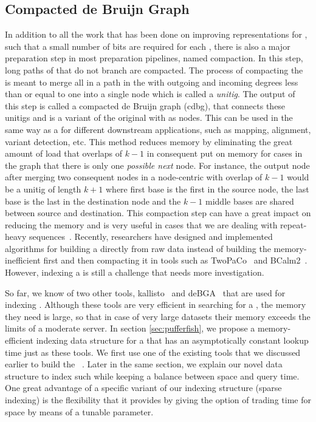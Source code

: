 \subsection{Compacted de Bruijn Graph}
\label{subsubsec:cdbg}
In addition to all the work that has been done on improving representations for \dbgs, such that a small number of bits are required for each \kmer, there is also a major preparation step in most \dbg preparation pipelines, named compaction. In this step, long paths of \kmers that do not branch are compacted. The process of compacting the \dbg is meant to merge all \kmers in a path in the \dbg with outgoing and incoming degrees less than or equal to one into a single node which is called a \emph{unitig}. The output of this step is called a compacted de Bruijn graph (cdbg), that connects these unitigs and is a variant of the original \dbg with \kmers as nodes. This can be used in the same way as a \dbg for different downstream applications, such as mapping, alignment, variant detection, etc. This method reduces memory by eliminating the great amount of load that overlaps of $k-1$ in consequent \kmers put on memory for cases in the graph that there is only one \textit{possible next} node. For instance, the output node after merging two consequent nodes in a node-centric \dbg with overlap of $k-1$ would be a unitig of length $k+1$ where first base is the first in the source node, the last base is the last in the destination node and the $k-1$ middle bases are shared between source and destination. This compaction step can have a great impact on reducing the memory and is very useful in cases that we are dealing with repeat-heavy sequences~\cite{liu2016debga}. Recently, researchers have designed and implemented algorithms for building a \ccdbg directly from raw data instead of building the memory-inefficient \dbg first and then compacting it in tools such as TwoPaCo~\cite{minkin2016twopaco} and BCalm2~\cite{chikhi2016compacting}. However, indexing a \ccdbg is still a challenge that needs more investigation. 

So far, we know of two other tools, kallisto~\cite{Bray2016Kallisto} and deBGA~\cite{liu2016debga} that are used for indexing \ccdbgs. Although these tools are very efficient in searching for a \kmer, the memory they need is large, so that in case of very large datasets their memory exceeds the limits of a moderate server. In section \ref{sec:pufferfish}, we propose a memory-efficient indexing data structure for a \ccdbg that has an asymptotically constant \kmer lookup time just as these tools. We first use one of the existing tools that we discussed earlier to build the \ccdbg~\cite{minkin2016twopaco}. Later in the same section, we explain our novel data structure to index such \ccdbgs while keeping a balance between space and query time. One great advantage of a specific variant of our indexing structure (sparse indexing) is the flexibility that it provides by giving the option of trading time for space by means of a tunable parameter.

